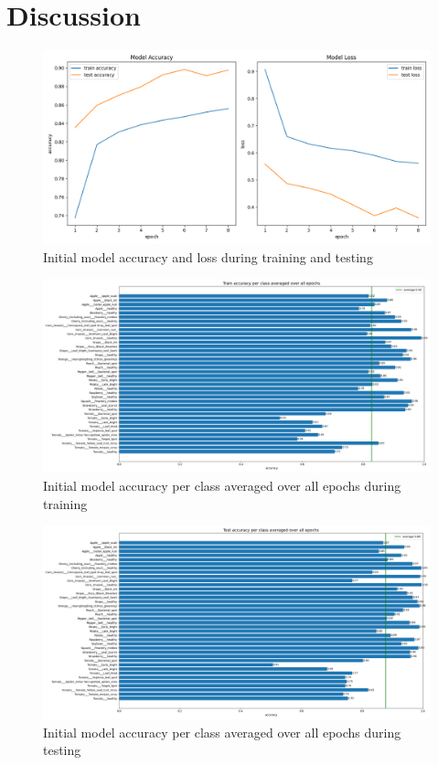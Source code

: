 \documentclass{BachelorBUI}
\begin{document}
\section{Discussion}
    \begin{figure}[h]
        \centering
        \includegraphics[width=\textwidth]{initial_accuracy_and_loss_2024-11-25_07.55.35.png}
        \caption{\centering Initial model accuracy and loss during training and testing}
        \label{fig:initial_accuracy_and_loss}
    \end{figure}
    \begin{figure}[h]
        \centering
        \includegraphics[width=\textwidth]{initial_train_accuracy_per_class_2024-11-25_07.55.35.png}
        \caption{\centering Initial model accuracy per class averaged over all epochs during training}
        \label{fig:initial_train_accuracy_per_class}
    \end{figure}
    \begin{figure}[h]
        \centering
        \includegraphics[width=\textwidth]{initial_test_accuracy_per_class_2024-11-25_07.55.35.png}
        \caption{\centering Initial model accuracy per class averaged over all epochs during testing}
        \label{fig:initial_test_accuracy_per_class}
    \end{figure}
\end{document}

